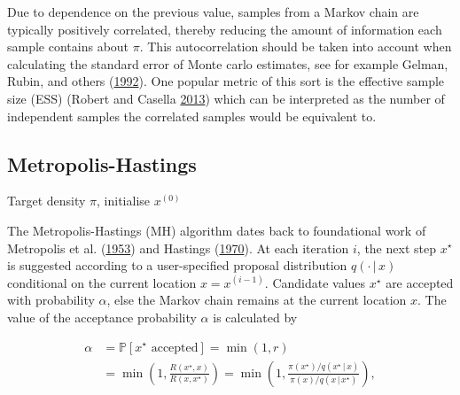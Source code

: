 \documentclass[11pt,]{book}
\begin{document}
Due to dependence on the previous value, samples from a Markov chain are
typically positively correlated, thereby reducing the amount of
information each sample contains about \(\pi\). This autocorrelation
should be taken into account when calculating the standard error of
Monte carlo estimates, see for example Gelman, Rubin, and others
(\protect\hyperlink{ref-gelman1992inference}{1992}). One popular metric
of this sort is the effective sample size (ESS) (Robert and Casella
\protect\hyperlink{ref-robert2013monte}{2013}) which can be interpreted
as the number of independent samples the correlated samples would be
equivalent to.

\subsection{Metropolis-Hastings}\label{metropolis-hastings}

\begin{center}
\begin{tcolorbox}[title= Algorithm~\ref*{alg:mh}: Metropolis-Hastings sampler, colback=white, width=0.95\linewidth, sharp corners]
\begin{algorithm}[H]
Target density $\pi$, initialise $x^{(0)}$\;
\caption{}
\label{alg:mh}
\end{algorithm}
\end{tcolorbox}
\end{center}

The Metropolis-Hastings (MH) algorithm dates back to foundational work
of Metropolis et al.
(\protect\hyperlink{ref-metropolis1953equation}{1953}) and Hastings
(\protect\hyperlink{ref-hastings1970monte}{1970}). At each iteration
\(i\), the next step \(x^\star\) is suggested according to a
user-specified proposal distribution \(q(\cdot \, | \, x)\) conditional
on the current location \(x = x^{(i-1)}\). Candidate values \(x^\star\)
are accepted with probability \(\alpha\), else the Markov chain remains
at the current location \(x\). The value of the acceptance probability
\(\alpha\) is calculated by

\begin{align}
\alpha &= \mathbb{P}[x^\star \text{ accepted}] 
= \min (1, r) \nonumber \\
&= \min \left(1, \frac{R(x^\star, x)}{R(x, x^\star)}\right)
= \min \left(1, \frac{\pi(x^\star) / q(x^\star \, | \, x)}{\pi(x) / q(x  \, | \, x^\star)}\right), \label{eq:acceptr}
\end{align}
\end{document}
